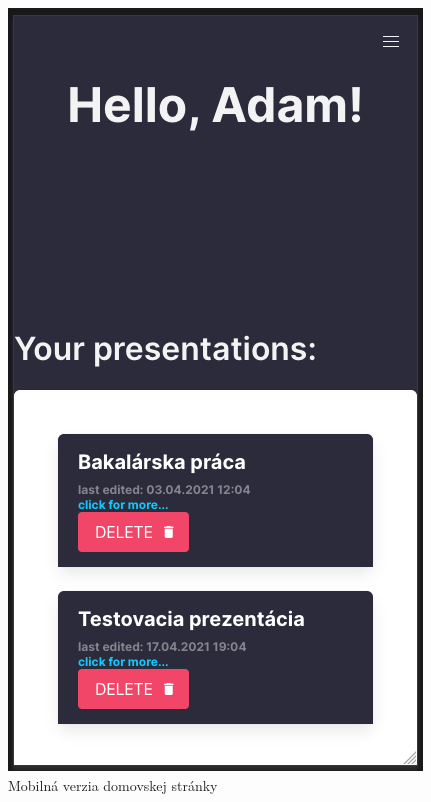 \begin{figure}[!hbt]
\centering
\begin{minipage}{.5\textwidth}
  \centering
  \includegraphics[scale=0.2]{obrazky/mobil_domovska_stranka.png}
  \caption{Mobilná verzia domovskej stránky}
  \label{pic:mobil_domovska_stranka}
\end{minipage}%
\begin{minipage}{.5\textwidth}
  \centering

\end{minipage}
\end{figure}
